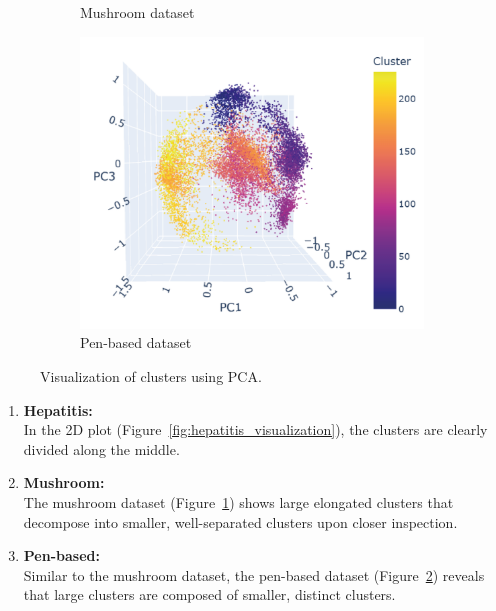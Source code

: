 \begin{figure}[H]
\begin{subfigure}[b]{0.32\textwidth}
		\caption{Mushroom dataset}
		\label{fig:mushroom_visualization}
	\end{subfigure}
	\begin{subfigure}[b]{0.32\textwidth}
		\centering
		\includegraphics[width=\linewidth]{figures/XMeans/pen-based_visualization.png}
		\caption{Pen-based dataset}
		\label{fig:pen_based_visualization}
	\end{subfigure}
	\caption{Visualization of clusters using PCA.}
	\label{fig:xmeans_visualization}
\end{figure}

\begin{enumerate}
	\item \textbf{Hepatitis:}
	\\ In the 2D plot (Figure~\ref{fig:hepatitis_visualization}), the clusters are clearly divided along the middle.
	
	\item \textbf{Mushroom:}
	\\ The mushroom dataset (Figure~\ref{fig:mushroom_visualization}) shows large elongated clusters that decompose into smaller, well-separated clusters upon closer inspection.
	
	\item \textbf{Pen-based:}
	\\ Similar to the mushroom dataset, the pen-based dataset (Figure~\ref{fig:pen_based_visualization}) reveals that large clusters are composed of smaller, distinct clusters.
\end{enumerate}
